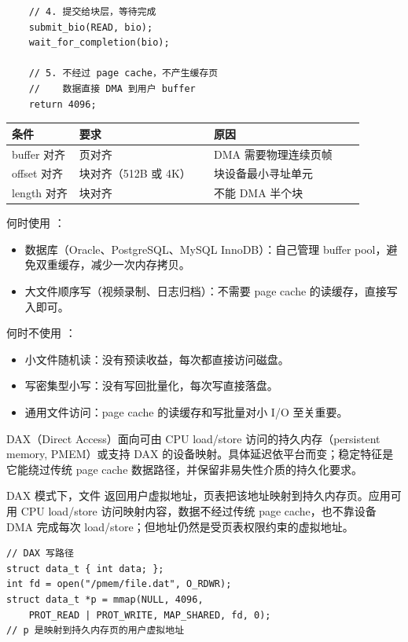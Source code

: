 \begin{filesystemlayout}
\begin{lstlisting}
    // 4. 提交给块层，等待完成
    submit_bio(READ, bio);
    wait_for_completion(bio);

    // 5. 不经过 page cache，不产生缓存页
    //    数据直接 DMA 到用户 buffer
    return 4096;
\end{lstlisting}

\begin{longtable}{|F{0.17\linewidth}|F{0.34\linewidth}|F{0.38\linewidth}|}
\toprule
{}
条件 & 要求 & 原因 \\
\midrule
buffer 对齐 & 页对齐 & DMA 需要物理连续页帧 \\\tablerowrule
offset 对齐 & 块对齐（512B 或 4K） & 块设备最小寻址单元 \\\tablerowrule
length 对齐 & 块对齐 & 不能 DMA 半个块 \\
\bottomrule
\end{longtable}

何时使用 ：

\begin{itemize}
\tightlist
\item 数据库（Oracle、PostgreSQL、MySQL InnoDB）：自己管理 buffer pool，避免双重缓存，减少一次内存拷贝。
\item 大文件顺序写（视频录制、日志归档）：不需要 page cache 的读缓存，直接写入即可。
\end{itemize}

何时不使用 ：

\begin{itemize}
\tightlist
\item 小文件随机读：没有预读收益，每次都直接访问磁盘。
\item 写密集型小写：没有写回批量化，每次写直接落盘。
\item 通用文件访问：page cache 的读缓存和写批量对小 I/O 至关重要。
\end{itemize}


DAX（Direct Access）面向可由 CPU load/store 访问的持久内存（persistent memory, PMEM）或支持 DAX 的设备映射。具体延迟依平台而变；稳定特征是它能绕过传统 page cache 数据路径，并保留非易失性介质的持久化要求。

DAX 模式下，文件  返回用户虚拟地址，页表把该地址映射到持久内存页。应用可用 CPU load/store 访问映射内容，数据不经过传统 page cache，也不靠设备 DMA 完成每次 load/store；但地址仍然是受页表权限约束的虚拟地址。

\begin{lstlisting}
// DAX 写路径
struct data_t { int data; };
int fd = open("/pmem/file.dat", O_RDWR);
struct data_t *p = mmap(NULL, 4096,
    PROT_READ | PROT_WRITE, MAP_SHARED, fd, 0);
// p 是映射到持久内存页的用户虚拟地址


\end{lstlisting}
\end{filesystemlayout}
